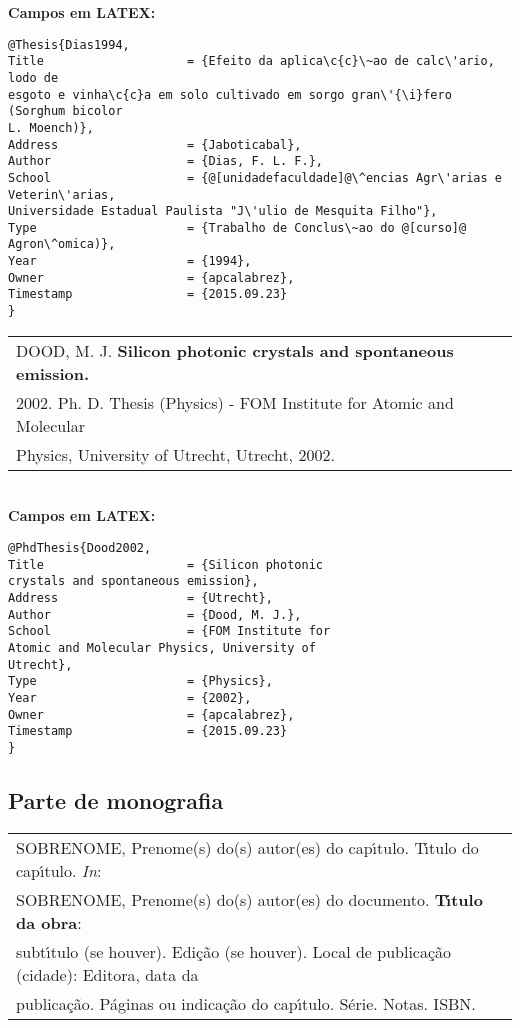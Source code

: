 \textbf{Campos em LATEX:} 

\begin{verbatim}
@Thesis{Dias1994,
Title                    = {Efeito da aplica\c{c}\~ao de calc\'ario, lodo de 
esgoto e vinha\c{c}a em solo cultivado em sorgo gran\'{\i}fero (Sorghum bicolor 
L. Moench)},
Address                  = {Jaboticabal},
Author                   = {Dias, F. L. F.},
School                   = {@[unidadefaculdade]@\^encias Agr\'arias e Veterin\'arias, 
Universidade Estadual Paulista "J\'ulio de Mesquita Filho"},
Type                     = {Trabalho de Conclus\~ao do @[curso]@
Agron\^omica)},
Year                     = {1994},
Owner                    = {apcalabrez},
Timestamp                = {2015.09.23}
}
\end{verbatim}


\begin{tabular}{|l|c|} \hline
	DOOD, M. J. \textbf{Silicon photonic crystals and spontaneous emission.} \\ 2002.
	 Ph. D. Thesis (Physics) - FOM Institute for Atomic and Molecular
	 \\ Physics, University of Utrecht, Utrecht, 2002.    \\\hline
\end{tabular} \\

\textbf{Campos em LATEX:} \\

\begin{verbatim}
@PhdThesis{Dood2002,
Title                    = {Silicon photonic
crystals and spontaneous emission},
Address                  = {Utrecht},
Author                   = {Dood, M. J.},
School                   = {FOM Institute for
Atomic and Molecular Physics, University of
Utrecht},
Type                     = {Physics},
Year                     = {2002},
Owner                    = {apcalabrez},
Timestamp                = {2015.09.23}
}
\end{verbatim}

\subsection{Parte de monografia}	

\begin{tabular}{|l|c|} \hline
	SOBRENOME, Prenome(s) do(s) autor(es) do cap\'{\i}tulo. T\'{\i}tulo do cap\'{\i}tulo. \textit{In}: \\ SOBRENOME, Prenome(s) do(s) autor(es) do documento. \textbf{T\'{\i}tulo da obra}: \\ subt\'{\i}tulo (se houver). Edi\c{c}\~ao (se houver). Local de publica\c{c}\~ao (cidade): Editora, data da\\ publica\c{c}\~ao. P\'aginas ou indica\c{c}\~ao do cap\'{\i}tulo. S\'erie. Notas. ISBN.     \\\hline
\end{tabular} \\

